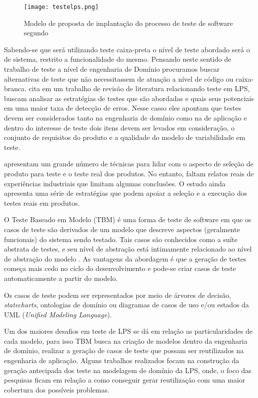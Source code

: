 \begin{figure}[htb]
	\centering
	\texttt{[image: testelps.png]}
	\caption{ Modelo de proposta de implantação do processo de teste de software segundo \cite{crespo2004metodologia}}
	\label{fig:testelps}
\end{figure}

Sabendo-se que será utilizando teste caixa-preta o nível de teste abordado será o de sistema, restrito a funcionalidade do mesmo. Pensando neste sentido de trabalho de teste a nível de engenharia de Domínio procuramos buscar alternativas de teste que não necessitassem de atuação a nível de código ou caixa-branca.
\newpage
\citealp{do2014strategies} cita em um trabalho de revisão de literatura relacionando teste em LPS, buscam analisar as estratégias de testes que são abordadas e quais seus potenciais em uma maior taxa de detecção de erros. Nesse casso eles apontam que testes devem ser considerados tanto na engenharia de domínio como na de aplicação e dentro do interesse de teste dois itens devem ser levados em consideração, o conjunto de requisitos do produto e a qualidade do modelo de variabilidade em teste.

\cite{do2014strategies} apresentam um grande número de técnicas para lidar com o aspecto de seleção de produto para teste e o teste real dos produtos. No entanto, faltam relatos reais de experiências industriais que limitam algumas conclusões. O estudo ainda apresenta uma série de estratégias que podem apoiar a seleção e a execução dos testes reais em produtos.

O Teste Baseado em Modelo (TBM) é uma forma de teste de software em que os casos de teste são derivados de um modelo que descreve aspectos (geralmente funcionais) do sistema sendo testado. Tais casos são conhecidos como a suíte abstrata de testes, e seu nível de abstração está intimamente relacionado ao nível de abstração do modelo \cite{do2014strategies}. As vantagens da abordagem é que a geração de testes começa mais cedo no ciclo do desenvolvimento e pode-se criar casos de teste automaticamente a partir do modelo. 

Os casos de teste podem ser representados por meio de árvores de decisão, \textit{statecharts}, ontologias de domínio ou diagramas de casos de uso e/ou estados da UML (\textit{Unified Modeling Language})\cite{isa2017model}.

Um dos maiores desafios em teste de LPS se dá em relação as particularidades de cada modelo, para isso TBM busca na criação de modelos dentro da engenharia de domínio, realizar a geração de casos de teste que possam ser reutilizados na engenharia de aplicação. Alguns trabalhos realizados focam na construção da geração antecipada dos teste na modelagem de domínio da LPS, onde, o foco das pesquisas ficam em relação a como conseguir gerar reutilização com uma maior cobertura dos possíveis problemas.

